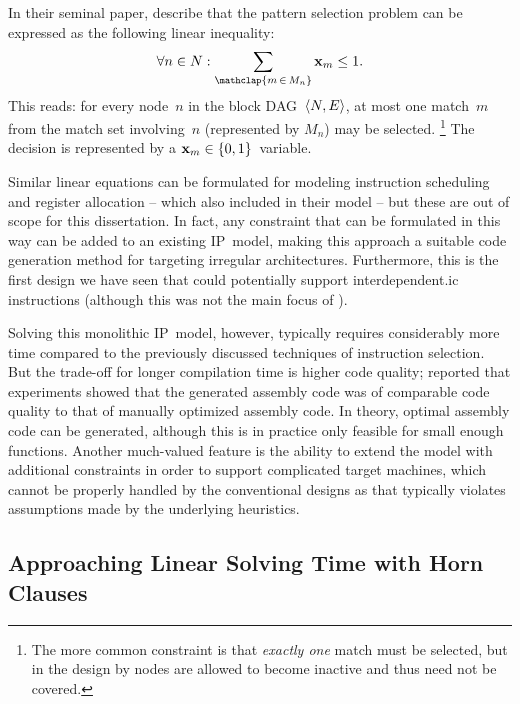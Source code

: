 In their seminal paper, \citeauthor{WilsonEtAl:1994} describe that the
\gls{pattern selection} problem can be expressed as the following linear
inequality:
%
\begin{displaymath}
  \forall n \in N : \sum_{\mathclap{m \,\in\, M_n}} \mVar{x}_m \leq 1.
\end{displaymath}
%
This reads: for every \gls{node}~$n$ in the \gls{block DAG}~\mbox{$\mTuple{N,
    E}$}, at most one \gls{match}~$m$ from the \gls{match set} involving~$n$
(represented by $M_n$) may be selected.\!%
%
\footnote{%
  The more common \gls{constraint} is that \emph{exactly one} \gls{match} must
  be selected, but in the design by \citeauthor{WilsonEtAl:1994} \glspl{node}
  are allowed to become inactive and thus need not be covered.%
}
%
The decision is represented by a $\mVar{x}_m \in \mSet{0, 1}$~\gls{variable}.

Similar linear equations can be formulated for modeling \gls{instruction
  scheduling} and \gls{register allocation} -- which
\citeauthor{WilsonEtAl:1994} also included in their model -- but these are out
of scope for this dissertation.
%
In fact, any \gls{constraint} that can be formulated in this way can be added to
an existing \gls{IP}~model, making this approach a suitable \gls{code
  generation} method for targeting irregular architectures.
%
Furthermore, this is the first design we have seen that could potentially
support \gls{interdependent.ic} \glspl{instruction} (although this was not the
main focus of \citeauthor{WilsonEtAl:1994}).

Solving this monolithic \gls{IP}~model, however, typically requires considerably
more time compared to the previously discussed techniques of \gls{instruction
  selection}.
%
But the trade-off for longer compilation time is higher code quality;
\citeauthor{WilsonEtAl:1994} reported that experiments showed that the generated
\gls{assembly code} was of comparable code quality to that of manually optimized
\gls{assembly code}.
%
In theory, optimal \gls{assembly code} can be generated, although this is in
practice only feasible for small enough \glspl{function}.
%
Another much-valued feature is the ability to extend the model with additional
\glspl{constraint} in order to support complicated \glspl{target machine}, which
cannot be properly handled by the conventional designs as that typically
violates assumptions made by the underlying heuristics.


\subsection{Approaching Linear Solving Time with Horn Clauses}

